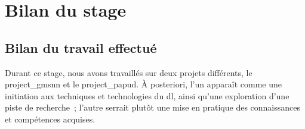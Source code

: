 






\chapter{Bilan du stage}
\section{Bilan du travail effectué}
Durant ce stage, nous avons travaillés sur deux projets différents, le \gls{project_gmsnn} et le \gls{project_papud}.
À posteriori, l'un apparaît comme une initiation aux techniques et technologies du \gls{dl}, ainsi qu'une exploration d'une piste de recherche~; l'autre serrait plutôt une mise en pratique des connaissances et compétences acquises.

